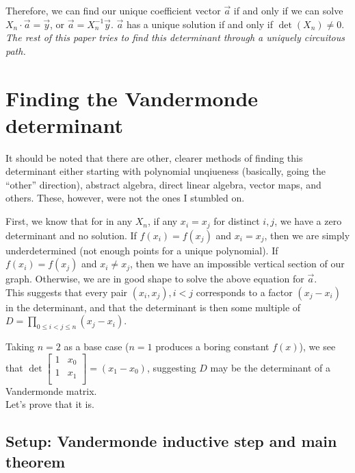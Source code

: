 \documentclass[11pt, oneside]{article} 	%
\begin{document}
Therefore, we can find our unique coefficient vector $\vec{a}$ if and only if we can solve $X_n \cdot \vec{a} = \vec{y}$, or $\vec{a} = X_n^{-1} \vec{y}$.  $\vec{a}$ has a unique solution if and only if $\det(X_n) \neq 0$.  
\\

\emph{The rest of this paper tries to find this determinant through a uniquely circuitous path.}

\section{Finding the Vandermonde determinant}

It should be noted that there are other, clearer methods of finding this determinant\cite{1} either starting with polynomial unqiueness (basically, going the ``other'' direction), abstract algebra, direct linear algebra, vector maps, and others.  These, however, were not the ones I stumbled on.

First, we know that for in any $X_n$, if any $x_i = x_j$ for distinct $i, j$, we have a zero determinant and no solution. If $f(x_i) = f(x_j)$ and $x_i = x_j$, then we are simply underdetermined (not enough points for a unique polynomial).   If $f(x_i) = f(x_j)$ and $x_i \neq x_j$, then we have an impossible vertical section of our graph.  Otherwise, we are in good shape to solve the above equation for $\vec{a}$.
\\

This suggests that every pair $(x_i, x_j), i < j$ corresponds to a factor  $(x_j - x_i)$ in the determinant, and that the determinant is then some multiple of $D = \prod_{0 \leq i < j \leq n}(x_j-x_i)$.

Taking $n=2$ as a base case ($n=1$ produces a boring constant $f(x)$), we see that 
 $\det\begin{bmatrix}
1 & x_0  \\
1 & x_1  \\
\end{bmatrix} = (x_1 - x_0)$, suggesting $D$ may be the determinant of a Vandermonde matrix.  
\\

Let's prove that it is.

\subsection{Setup: Vandermonde inductive step and main theorem}

\end{document}

